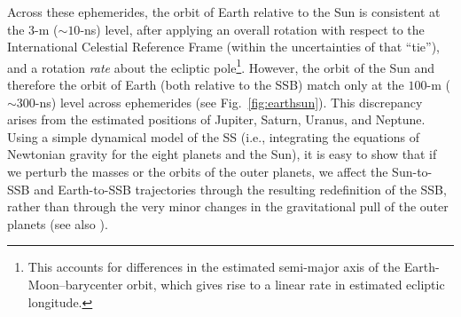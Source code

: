\documentclass{aastex63}
\begin{document}
Across these ephemerides, the orbit of Earth relative to the Sun is consistent at the $3$-m ($\sim 10$-ns) level, after applying an overall rotation with respect to the International Celestial Reference Frame (within the uncertainties of that ``tie''), and a rotation \emph{rate} about the ecliptic pole\footnote{\label{footnote:rate}This accounts for differences in the estimated semi-major axis of the Earth-Moon--barycenter orbit, which gives rise to a linear rate in estimated ecliptic longitude.}.
However, the orbit of the Sun and therefore the orbit of Earth (both relative to the SSB) match only at the $100$-m ($\sim 300$-ns) level across ephemerides (see Fig.\ \ref{fig:earthsun}). This discrepancy arises from the estimated positions of Jupiter, Saturn, Uranus, and Neptune. Using a simple dynamical model of the SS (i.e., integrating the equations of Newtonian gravity for the eight planets and the Sun), it is easy to show that if we perturb the masses or the orbits of the outer planets, we affect the Sun-to-SSB and Earth-to-SSB trajectories through the resulting redefinition of the SSB, rather than through the very minor changes in the gravitational pull of the outer planets (see also \citealt{2019MNRAS.489.5573G}).
%
\end{document}

